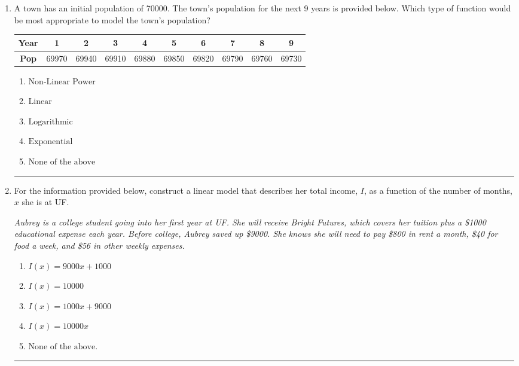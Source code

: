 \documentclass[14pt]{extbook}
\newcommand{\litem}[1]{\item#1\hspace*{-1cm}\rule{\textwidth}{0.4pt}}
\begin{document}
\begin{enumerate}
{\begin{enumerate}[label=\Alph*.]
\end{enumerate} }
\litem{
A town has an initial population of 70000. The town's population for the next 9 years is provided below. Which type of function would be most appropriate to model the town's population?

\begin{tabular}{c|c|c|c|c|c|c|c|c|c}
\textbf{Year} &1 &2 &3 &4 &5 &6 &7 &8 &9\tabularnewline \hline
\textbf{Pop} &69970 &69940 &69910 &69880 &69850 &69820 &69790 &69760 &69730\end{tabular}\begin{enumerate}[label=\Alph*.]
\item \( \text{Non-Linear Power} \)
\item \( \text{Linear} \)
\item \( \text{Logarithmic} \)
\item \( \text{Exponential} \)
\item \( \text{None of the above} \)

\end{enumerate} }
\litem{
For the information provided below, construct a linear model that describes her total income, $I$, as a function of the number of months, $x$ she is at UF.
\begin{center}
    \textit{ Aubrey is a college student going into her first year at UF. She will receive Bright Futures, which covers her tuition plus a \$1000 educational expense each year. Before college, Aubrey saved up \$9000. She knows she will need to pay \$800 in rent a month, \$40 for food a week, and \$56 in other weekly expenses. }
\end{center}
\begin{enumerate}[label=\Alph*.]
\item \( I(x) = 9000 x + 1000 \)
\item \( I(x) = 10000 \)
\item \( I(x) = 1000 x + 9000 \)
\item \( I(x) = 10000 x \)
\item \( \text{None of the above.} \)

\end{enumerate} }
\end{enumerate}
\end{document}
